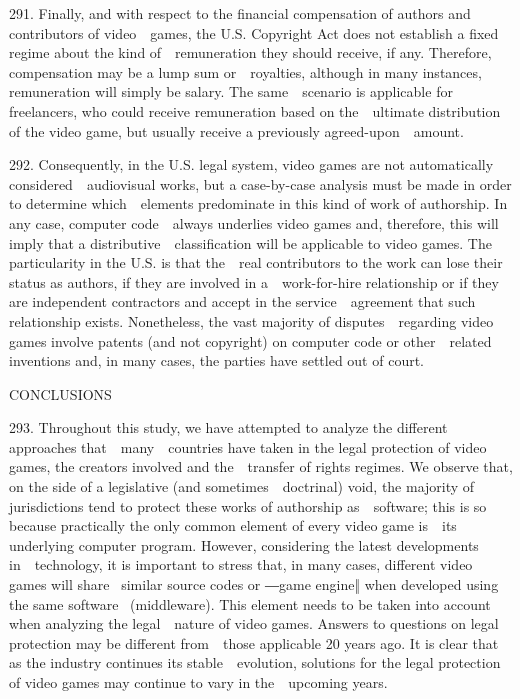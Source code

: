 \documentclass[
]{article}
\begin{document}
{291. }{Finally, and with respect to the financial compensation of
authors and contributors of video~~games, the U.S. }{Copyright Act
}{does not establish a fixed regime about the kind of~~remuneration they
should receive, if any. Therefore, compensation may be a lump sum
or~~royalties, although in many instances, remuneration will simply be
salary. The same~~scenario is applicable for freelancers, who could
receive remuneration based on the~~ultimate distribution of the video
game, but usually receive a previously agreed-upon~~amount.}

{292. }{Consequently, in the U.S. legal system, video games are not
automatically considered~~audiovisual works, but a case-by-case analysis
must be made in order to determine which~~elements predominate in this
kind of work of authorship. In any case, computer code~~always underlies
video games and, therefore, this will imply that a
distributive~~classification will be applicable to video games. The
particularity in the U.S. is that the~~real contributors to the work can
lose their status as }{authors}{, if they are involved in
a~~work-for-hire relationship or if they are independent contractors and
accept in the service~~agreement that such relationship exists.
Nonetheless, the vast majority of disputes~~regarding video games
involve patents (and not copyright) on computer code or other~~related
inventions and, in many cases, the parties have settled out of court.}

{CONCLUSIONS}

{293. }{Throughout this study, we have attempted to analyze the
different approaches that~~many~~countries have taken in the legal
protection of video games, the creators involved and the~~transfer of
rights regimes. We observe that, on the side of a legislative (and
sometimes~~doctrinal) void, the majority of jurisdictions tend to
protect these works of authorship as~~software; this is so because
practically the only common element of every video game is~~its
underlying computer program. However, considering the latest
developments in~~technology, it is important to stress that, in many
cases, different video games will share }{~similar source codes or ―game
engine‖ when developed using the same software }{~(}{middleware}{). This
element needs to be taken into account when analyzing the legal~~nature
of video games. Answers to questions on legal protection may be
different from~~those applicable 20 years ago. It is clear that as the
industry continues its stable~~evolution, solutions for the legal
protection of video games may continue to vary in the~~upcoming years.}
\end{document}
